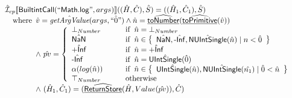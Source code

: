 \[\begin{array}{l}
\aI _{cp}\lbr \SF{BuiltintCall}(``\SF{Math.log}",args)\rbr((\hat{H},\hat{C}), \hat{S})
  = ((\hat{H}_1, \hat{C}_1), \hat{S})\\
\quad\wherec{
  \hat{v}=\hat{\hf{getArgValue}}(args, \hat{``0"}) \land \hat{n}=\ahf{toNumber}(\ahf{toPrimitive}(\hat{v}))\\
  \land\ \hat{pv}   = 
  \left\{
    \begin{array}{l@{\quad\quad\quad}l}
      \bot_{Number} & \ifc{\hat{n} = \bot_{Number}}\\
      \hat{\SF{NaN}} & \ifc{\hat{n} \in \set{\hat{\SF{NaN}}, \hat{\SF{-Inf}}, \hat{\SF{NUIntSingle}}(\hat{n}) \mid n<\hat{0}}}\\
      \hat{\SF{+Inf}} & \ifc{\hat{n} = \hat{\SF{+Inf}}}\\
      \hat{\SF{-Inf}} & \ifc{\hat{n} =\hat{\SF{UIntSingle}}(\hat{0})}\\
      \alpha(log(\hat{n})) & \ifc{\hat{n} \in \set{\hat{\SF{UIntSingle}}(\hat{n}), \hat{\SF{NUIntSingle}}(\hat{n_1}) \mid \hat{0}<\hat{n}}}\\
      \top_{Number} & \owc\\
    \end{array}
  \right.\\
  \land\ (\hat{H}_1, \hat{C}_1) = (\ahf{ReturnStore}(\hat{H}, Value(\hat{pv})), \hat{C})
  }\\
\\\\


\end{array}
\]
